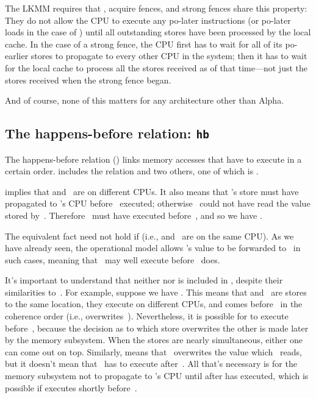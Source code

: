 The LKMM requires that , acquire fences, and strong fences
share this property:
They do not allow the CPU to execute any po-later instructions (or
po-later loads in the case of ) until all outstanding
stores have been processed by the local cache.
In the case of a strong fence, the CPU first has to wait for all of its
po-earlier stores to propagate to every other CPU in the system; then
it has to wait for the local cache to process all the stores received
as of that time---not just the stores received when the strong fence
began.

And of course, none of this matters for any architecture other than
Alpha.


\subsection{The happens-before relation: \texttt{hb}}
\label{sec:docs:explanation:The Happens-before Relation: hb}

The happens-before relation () links memory accesses that have to
execute in a certain order.
 includes the  relation and two others, one of which is .

 implies that  and~ are on different CPUs.
It also means that 's store must have propagated to 's
CPU before ~executed; otherwise ~could not have read the
value stored by~.
Therefore ~must have executed before~, and so we have
.

The equivalent fact need not hold if 
(i.e.,  and~ are on the same CPU\@).
As we have already seen, the operational model allows 's value
to be forwarded to~ in such cases, meaning that ~may well
execute before ~does.

It's important to understand that neither  nor  is included in
, despite their similarities to~.
For example, suppose we have .
This means that  and~ are stores to the same location,
they execute on different CPUs, and  comes before~ in the coherence
order (i.e.,  overwrites~).
Nevertheless, it is possible for  to execute before~,
because the decision as to which store overwrites the other is made
later by the memory subsystem.
When the stores are nearly simultaneous, either one can come out on top.
Similarly,  means that ~overwrites the value
which ~reads, but it doesn't mean that ~has to execute
after~.
All that's necessary is for the memory subsystem not to propagate 
to 's CPU until after  has executed, which is possible if
 executes shortly before~.

